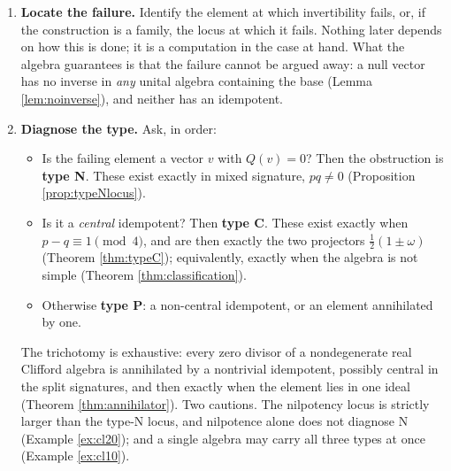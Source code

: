 \begin{enumerate}
\item[\textbf{Step 1.}] \textbf{Locate the failure.} Identify the element at which invertibility fails, or, if the construction is a family, the locus at which it fails. Nothing later depends on how this is done; it is a computation in the case at hand. What the algebra guarantees is that the failure cannot be argued away: a null vector has no inverse in \emph{any} unital algebra containing the base (Lemma \ref{lem:noinverse}), and neither has an idempotent.

\item[\textbf{Step 2.}] \textbf{Diagnose the type.} Ask, in order:
  \begin{itemize}
  \item Is the failing element a vector $v$ with $Q(v) = 0$? Then the obstruction is \textbf{type N}. These exist exactly in mixed signature, $pq \neq 0$ (Proposition \ref{prop:typeNlocus}).
  \item Is it a \emph{central} idempotent? Then \textbf{type C}. These exist exactly when $p - q \equiv 1 \pmod 4$, and are then exactly the two projectors $\tfrac12(1 \pm \omega)$ (Theorem \ref{thm:typeC}); equivalently, exactly when the algebra is not simple (Theorem \ref{thm:classification}).
  \item Otherwise \textbf{type P}: a non-central idempotent, or an element annihilated by one.
  \end{itemize}
  The trichotomy is exhaustive: every zero divisor of a nondegenerate real Clifford algebra is annihilated by a nontrivial idempotent, possibly central in the split signatures, and then exactly when the element lies in one ideal (Theorem \ref{thm:annihilator}). Two cautions. The nilpotency locus is strictly larger than the type-N locus, and nilpotence alone does not diagnose N (Example \ref{ex:cl20}); and a single algebra may carry all three types at once (Example \ref{ex:cl10}).


\end{enumerate}
